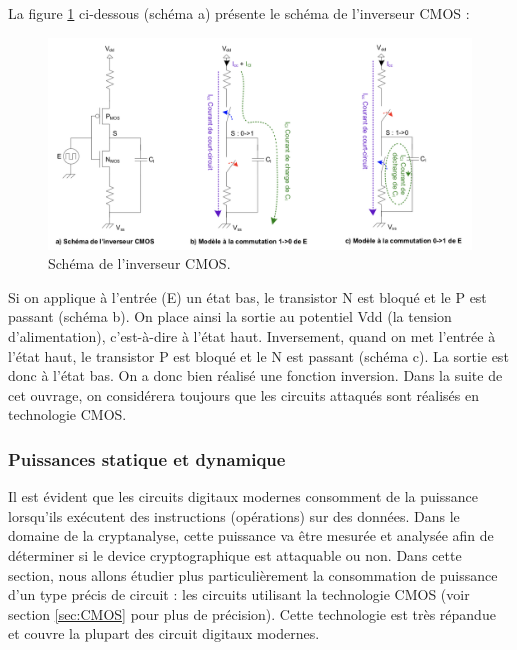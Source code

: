 \documentclass[oneside]{book}
\begin{document}
\hspace{-0.5 cm}La figure \ref{fig:CMOS} ci-dessous (schéma a) présente le schéma de l'inverseur CMOS :
\begin{figure}[htbp]
    \centering
    \includegraphics[scale=0.8]{image/CMOS}
    \caption{Schéma de l'inverseur CMOS.}
    \label{fig:CMOS} 
\end{figure}

Si on applique à l'entrée (E) un état bas, le transistor N est bloqué et le P est passant (schéma b). On place ainsi la sortie au potentiel Vdd (la tension d'alimentation), c'est-à-dire à l'état haut. Inversement, quand on met l'entrée à l'état haut, le transistor P est bloqué et le N est passant (schéma c). La sortie est donc à l'état bas. On a donc bien réalisé une fonction inversion. Dans la suite de cet ouvrage, on considérera toujours que les circuits attaqués sont réalisés en technologie CMOS.


\subsubsection{Puissances statique et dynamique}
\label{sec:puissance}
Il est évident que les circuits digitaux modernes consomment de la puissance lorsqu'ils exécutent des instructions (opérations) sur des données. Dans le domaine de la cryptanalyse, cette puissance va être mesurée et analysée afin de déterminer si le device cryptographique est attaquable ou non. Dans cette section, nous allons étudier plus particulièrement la consommation de puissance d'un type précis de circuit : les circuits utilisant la technologie CMOS (voir section \ref{sec:CMOS} pour plus de précision). Cette technologie est très répandue et couvre la plupart des circuit digitaux modernes. 
\end{document}
